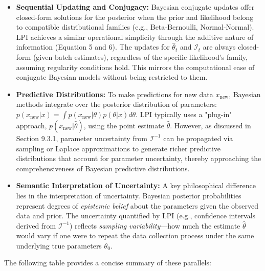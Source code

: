 \documentclass[11pt]{article}
\begin{document}
\begin{itemize}
    \item \textbf{Sequential Updating and Conjugacy:}
    Bayesian conjugate updates offer closed-form solutions for the posterior when the prior and likelihood belong to compatible distributional families (e.g., Beta-Bernoulli, Normal-Normal). LPI achieves a similar operational simplicity through the additive nature of information (Equation 5 and 6). The updates for $\hat{\theta}_t$ and $\mathcal{I}_t$ are always closed-form (given batch estimates), regardless of the specific likelihood's family, assuming regularity conditions hold. This mirrors the computational ease of conjugate Bayesian models without being restricted to them.

    \item \textbf{Predictive Distributions:}
    To make predictions for new data $x_{\text{new}}$, Bayesian methods integrate over the posterior distribution of parameters: $p(x_{\text{new}}|x) = \int p(x_{\text{new}}|\theta)p(\theta|x)d\theta$. LPI typically uses a "plug-in" approach, $p(x_{\text{new}}|\hat{\theta})$, using the point estimate $\hat{\theta}$. However, as discussed in Section 9.3.1, parameter uncertainty from $\mathcal{I}^{-1}$ can be propagated via sampling or Laplace approximations \cite{tierney1986accurate} to generate richer predictive distributions that account for parameter uncertainty, thereby approaching the comprehensiveness of Bayesian predictive distributions.

    \item \textbf{Semantic Interpretation of Uncertainty:}
    A key philosophical difference lies in the interpretation of uncertainty. Bayesian posterior probabilities represent degrees of \textit{epistemic belief} about the parameters given the observed data and prior. The uncertainty quantified by LPI (e.g., confidence intervals derived from $\mathcal{I}^{-1}$) reflects \textit{sampling variability}---how much the estimate $\hat{\theta}$ would vary if one were to repeat the data collection process under the same underlying true parameters $\theta_0$.
\end{itemize}

The following table provides a concise summary of these parallels:
\end{document}
